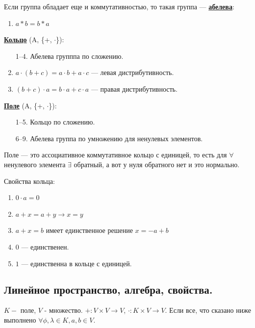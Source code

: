 \documentclass[twoside]{book}
\newcommand{\deff}[1]{\underline{\textbf{#1}}}
\begin{document}
Если группа обладает еще и коммутативностью, то такая группа --- \deff{абелева}:

\begin{enumerate}[resume]
    \item $a * b = b * a$
\end{enumerate}

\deff{Кольцо} (A, \{+, $\cdot$\}):

\begin{enumerate}
    \item[1--4.] Абелева групппа по сложению.
    \setcounter{enumi}{4}
    \item $a \cdot (b+c) = a\cdot b + a\cdot c$ --- левая дистрибутивность.
    \item $(b+c)\cdot a  = b \cdot a + c \cdot a$  --- правая дистрибутивность.
\end{enumerate}

\deff{Поле}  (A, \{+, $\cdot$\}):
\begin{enumerate}
    \item[1--5.] Кольцо по сложению.
    \item[6--9.] Абелева группа по умножению для ненулевых элементов.
\end{enumerate}

Поле --- это ассоциативное коммутативное кольцо с единицей, то есть для $\forall$ ненулевого элемента $\exists$ обратный, а вот у нуля обратного нет и это нормально.

Свойства кольца:

\begin{enumerate}
    \item $0 \cdot a = 0$
    \item $a+x = a+ y \rightarrow x=y$
    \item $a + x = b$ имеет единственное решение $x = -a + b$
    \item $0$ --- единственен.
    \item $1$ --- единственна в кольце с единицей.
\end{enumerate}

\subsection{Линейное пространство, алгебра, свойства.}

$K - $ поле, $V$ - множество. $+: V \times V \rightarrow V$, $\cdot: K\times V \rightarrow V$. Если все, что сказано ниже выполнено  $\forall \phi, \lambda \in K, a,b \in V$.
\end{document}
